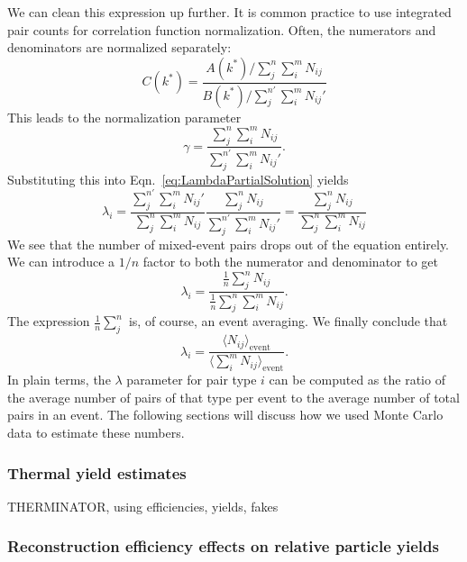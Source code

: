 We can clean this expression up further.  It is common practice to use integrated pair counts for correlation function normalization. Often, the numerators and denominators are normalized separately:
\begin{equation}
C(k^*) = \frac{A(k^*)/\sum_j^n \sum_i^m N_{ij}}{B(k^*)/\sum_j^{n'} \sum_i^m N_{ij}'}
\end{equation}
This leads to the normalization parameter
\begin{equation}
\gamma = \frac{\sum_j^n \sum_i^m N_{ij}}{\sum_j^{n'} \sum_i^m N_{ij}'}.
\end{equation}
Substituting this into Eqn.\ \ref{eq:LambdaPartialSolution} yields 
\begin{equation}
\lambda_i = \frac{\sum_j^{n'} \sum_i^m N_{ij}'} {\sum_j^n \sum_i^m N_{ij}} \frac{\sum_j^n N_{ij} }{\sum_j^{n'} \sum_i^m N_{ij}'} = \frac{\sum_j^n N_{ij} }{\sum_j^n \sum_i^m N_{ij}}
\end{equation}
We see that the number of mixed-event pairs drops out of the equation entirely. We can introduce a $1/n$ factor to both the numerator and denominator to get
\begin{equation}
\lambda_i = \frac{\frac{1}{n}\sum_j^n N_{ij} }{\frac{1}{n}\sum_j^n \sum_i^m N_{ij}}.
\end{equation}
The expression $\frac{1}{n} \sum_j^n$ is, of course, an event averaging. We finally conclude that
\begin{equation}
\label{eq:LambdaParSolution}
\lambda_i = \frac{\langle N_{ij}\rangle_{\mathrm{event}}} {\langle\sum_i^m N_{ij}\rangle_{\mathrm{event}}}.
\end{equation}
In plain terms, the $\lambda$ parameter for pair type $i$ can be computed as the ratio of the average number of pairs of that type per event to the average number of total pairs in an event. The following sections will discuss how we used Monte Carlo data to estimate these numbers.

\subsubsection{Thermal yield estimates}
\label{sec:ThermalYields}

THERMINATOR, using efficiencies, yields, fakes






\subsubsection{Reconstruction efficiency effects on relative particle yields}
\label{sec:ReconstructionEff}

